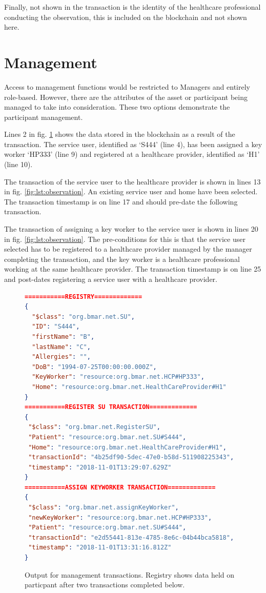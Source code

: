 \documentclass[runningheads]{llncs}
\begin{document}
Finally, not shown in the transaction is the identity of the healthcare professional conducting the observation, this is included on the blockchain and not shown here.


\section{Management}
Access to management functions would be restricted to Managers and entirely role-based. However, there are the attributes of the asset or participant being managed to take into consideration. These two options demonstrate the participant management.

Lines 2 in fig. \ref{fig:lst:management} shows the data stored in the blockchain as a result of the transaction.
The service user, identified as `S444' (line 4), has been assigned a key worker `HP333' (line 9) and registered at a healthcare provider, identified as `H1' (line 10). 

The transaction of the service user to the healthcare provider is shown in lines 13 in fig. \ref{fig:lst:observation}. An existing service user and home have been selected. The transaction timestamp is on line 17 and should pre-date the following transaction.

The transaction of assigning a key worker to the service user is shown in lines 20 in fig. \ref{fig:lst:observation}. The pre-conditions for this is that the service user selected has to be registered to a healthcare provider managed by the manager completing the transaction, and the key worker is a healthcare professional working at the same healthcare provider. The transaction timestamp is on line 25 and post-dates registering a service user with a healthcare provider. 



\begin{figure}
\tiny
	\begin{lstlisting}[language=json,firstnumber=1]
===========REGISTRY=============
{
  "$class": "org.bmar.net.SU",
  "ID": "S444",
  "firstName": "B",
  "lastName": "C",
  "Allergies": "",
  "DoB": "1994-07-25T00:00:00.000Z",
  "KeyWorker": "resource:org.bmar.net.HCP#HP333",
  "Home": "resource:org.bmar.net.HealthCareProvider#H1"
}
===========REGISTER SU TRANSACTION=============
{
 "$class": "org.bmar.net.RegisterSU",
 "Patient": "resource:org.bmar.net.SU#S444",
 "Home": "resource:org.bmar.net.HealthCareProvider#H1",
 "transactionId": "4b25df90-5dec-47e0-b58d-511908225343",
 "timestamp": "2018-11-01T13:29:07.629Z"
}
===========ASSIGN KEYWORKER TRANSACTION=============
{
 "$class": "org.bmar.net.assignKeyWorker",
 "newKeyWorker": "resource:org.bmar.net.HCP#HP333",
 "Patient": "resource:org.bmar.net.SU#S444",
 "transactionId": "e2d55441-813e-4785-8e6c-04b44bca5818",
 "timestamp": "2018-11-01T13:31:16.812Z"
}
	\end{lstlisting}
\caption{Output for management transactions. Registry shows data held on particpant after two transactions completed below.}
\label{fig:lst:management}
\end{figure}
\end{document}
